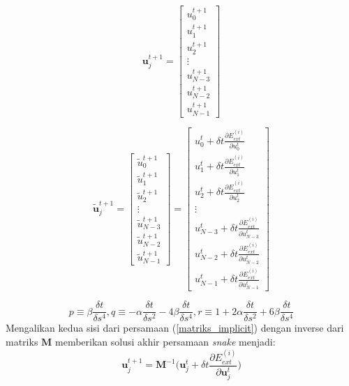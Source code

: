 \begin{equation}
	\label{matriks_ut1}
	{
		\textbf{u}^{t+1}_{j} =
	}
	{
		\begin{bmatrix}
			u^{t+1}_{0} 	\\
			u^{t+1}_{1} 	\\
			u^{t+1}_{2} 	\\
			\vdots 			\\
			u^{t+1}_{N-3}\\
			u^{t+1}_{N-2}\\
			u^{t+1}_{N-1}
		\end{bmatrix}
	}
\end{equation}

\begin{equation}
	\label{matriks_ut2}
	{
		\tilde{\textbf{u}}_{j}^{t+1} =
	}
	{
		\begin{bmatrix}
			\tilde{u}^{t+1}_{0} 	\\
			\tilde{u}^{t+1}_{1} 	\\
			\tilde{u}^{t+1}_{2} 	\\
			\vdots 					\\
			\tilde{u}^{t+1}_{N-3}	\\
			\tilde{u}^{t+1}_{N-2}	\\
			\tilde{u}^{t+1}_{N-1}
		\end{bmatrix}
	}
	{
		=
	}
	{
		\begin{bmatrix}
			u^{t}_{0} + \delta t \frac{\partial E^{(i)}_{ext} }{ \partial u^{t}_{0}} 	\\
			u^{t}_{1} + \delta t \frac{\partial E^{(i)}_{ext} }{ \partial u^{t}_{1}} 	\\
			u^{t}_{2} + \delta t \frac{\partial E^{(i)}_{ext} }{ \partial u^{t}_{2}} 	\\
			\vdots 					\\
			u^{t}_{N-3} + \delta t \frac{\partial E^{(i)}_{ext} }{ \partial u^{t}_{N-3}}	\\
			u^{t}_{N-2} + \delta t \frac{\partial E^{(i)}_{ext} }{ \partial u^{t}_{N-2}}	\\
			u^{t}_{N-1} + \delta t \frac{\partial E^{(i)}_{ext} }{ \partial u^{t}_{N-1}}
		\end{bmatrix}
	}
\end{equation}

\begin{equation}
	\label{consteq}
	p \equiv \beta \frac{\delta t}{\delta s^4}, q \equiv - \alpha \frac{\delta t}{\delta s^2} - 4 \beta \frac{\delta t}{\delta s^4}, r \equiv  1 + 2 \alpha \frac{\delta t}{\delta s^2} + 6 \beta \frac{\delta t}{\delta s^4}
\end{equation}
Mengalikan kedua sisi dari persamaan (\ref{matriks_implicit}) dengan inverse dari matriks $\textbf{M}$ memberikan solusi akhir persamaan \emph{snake} menjadi:
\begin{equation}
	\label{implicit}
	\textbf{u}^{t+1}_{j} = \textbf{M}^{-1} \biggl( \textbf{u}^t_{j} + \delta t  \frac{\partial E^{(i)}_{ext} }{ \partial \textbf{u}^{t}_{j}} \biggr)
\end{equation}

